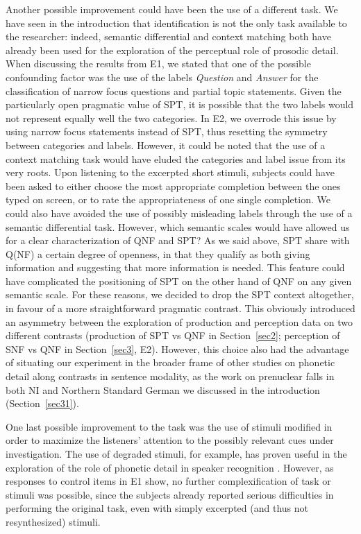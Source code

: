 Another possible improvement could have been the use of a different task. We have seen in the introduction that identification is not the only task available to the researcher: indeed, semantic differential and context matching both have already been used for the exploration of the perceptual role of prosodic detail. When discussing the results from E1, we stated that one of the possible confounding factor was the use of the labels \textit{Question} and \textit{Answer} for the classification of narrow focus questions and partial topic statements. Given the particularly open pragmatic value of SPT, it is possible that the two labels would not represent equally well the two categories. In E2, we overrode this issue by using narrow focus statements instead of SPT, thus resetting the symmetry between categories and labels. However, it could be noted that the use of a context matching task would have eluded the categories and label issue from its very roots. Upon listening to the excerpted short stimuli, subjects could have been asked to either choose the most appropriate completion between the ones typed on screen, or to rate the appropriateness of one single completion. We could also have avoided the use of possibly misleading labels through the use of a semantic differential task. However, which semantic scales would have allowed us for a clear characterization of QNF and SPT? As we said above, SPT share with Q(NF) a certain degree of openness, in that they qualify as both giving information and suggesting that more information is needed. This feature could have complicated the positioning of SPT on the other hand of QNF on any given semantic scale. For these reasons, we decided to drop the SPT context altogether, in favour of a more straightforward pragmatic contrast. This obviously introduced an asymmetry between the exploration of production and perception data on two different contrasts (production of SPT vs QNF in Section~\ref{sec2}; perception of SNF vs QNF in Section~\ref{sec3}, E2). However, this choice also had the advantage of situating our experiment in the broader frame of other studies on phonetic detail along contrasts in sentence modality, as the work on prenuclear falls in both NI and Northern Standard German we discussed in the introduction (Section~\ref{sec31}).

One last possible improvement to the task was the use of stimuli modified in order to maximize the listeners' attention to the possibly relevant cues under investigation. The use of degraded stimuli, for example, has proven useful in the exploration of the role of phonetic detail in speaker recognition \citep{sheffert2002learning}. However, as responses to control items in E1 show, no further complexification of task or stimuli was possible, since the subjects already reported serious difficulties in performing the original task, even with simply excerpted (and thus not resynthesized) stimuli.

